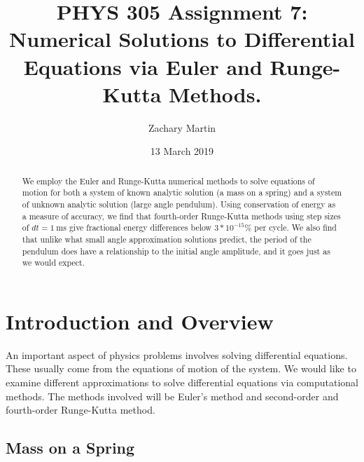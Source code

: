 \documentclass[aps,prl,twocolumn,superscriptaddress]{revtex4-1}
\begin{document}
\title{PHYS 305 Assignment 7: Numerical Solutions to Differential Equations via Euler and Runge-Kutta Methods.}
\author{Zachary Martin}
\date{13 March 2019}

\begin{abstract}
We employ the Euler and Runge-Kutta numerical methods to solve equations of motion for both a system of known analytic solution (a mass on a spring) and a system of unknown analytic solution (large angle pendulum). Using conservation of energy as a measure of accuracy, we find that fourth-order Runge-Kutta methods using step sizes of $dt = \SI{1}{\ms}$ give fractional energy differences below $3*10^{-15}$\% per cycle. We also find that unlike what small angle approximation solutions predict, the period of the pendulum does have a relationship to the initial angle amplitude, and it goes just as we would expect.
\end{abstract}

\maketitle

\section{Introduction and Overview}
An important aspect of physics problems involves solving differential equations. These usually come from the equations of motion of the system. We would like to examine different approximations to solve differential equations via computational methods. The methods involved will be Euler's method and second-order and fourth-order Runge-Kutta method.

\subsection{Mass on a Spring}
\end{document}
